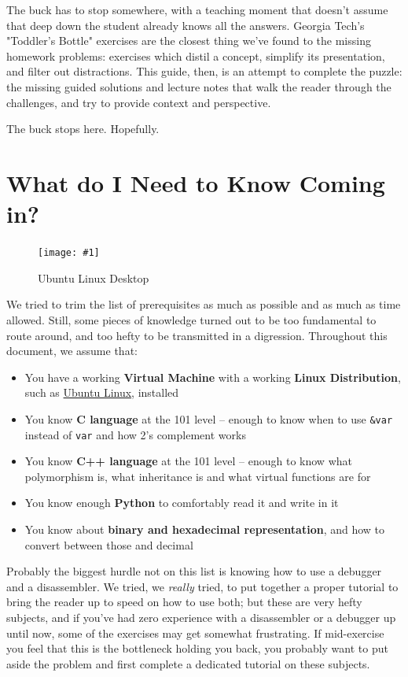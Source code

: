 \documentclass{article}
\newcommand{\wrapimagerightcap}[2] {
    \begin{figure}\begin{center}\texttt{[image: \#1]}\end{center}\caption{#2}\end{figure}}
\newcommand{\code}[1]{\colorbox{ubuntuback}{\texttt{#1}}}
\begin{document}
The buck has to stop somewhere, with a teaching moment that doesn't assume that deep down the student already knows all the answers. Georgia Tech's "Toddler's Bottle" exercises are the closest thing we've found to the missing homework problems: exercises which distil a concept, simplify its presentation, and filter out distractions. This guide, then, is an attempt to complete the puzzle: the missing guided solutions and lecture notes that walk the reader through the challenges, and try to provide context and perspective.

The buck stops here. Hopefully.

\section{What do I Need to Know Coming in?}

\wrapimagerightcap{./images/ubuntu.png}{Ubuntu Linux Desktop}

We tried to trim the list of prerequisites as much as possible and as much as time allowed. Still, some pieces of knowledge turned out to be too fundamental to route around, and too hefty to be transmitted in a digression. Throughout this document, we assume that:

\begin{itemize}
    \item You have a working \textbf{Virtual Machine} with a working \textbf{Linux Distribution}, such as \href{https://ubuntu.com/}{Ubuntu Linux}, installed
    \item You know \textbf{C language} at the 101 level -- enough to know when to use \code{\&var} instead of \code{var} and how 2's complement works
    \item You know \textbf{C++ language} at the 101 level -- enough to know what polymorphism is, what inheritance is and what virtual functions are for
    \item You know enough \textbf{Python} to comfortably read it and write in it
    \item You know about \textbf{binary and hexadecimal representation}, and how to convert between those and decimal
\end{itemize}

Probably the biggest hurdle not on this list is knowing how to use a debugger and a disassembler. We tried, we \textit{really} tried, to put together a proper tutorial to bring the reader up to speed on how to use both; but these are very hefty subjects, and if you've had zero experience with a disassembler or a debugger up until now, some of the exercises may get somewhat frustrating. If mid-exercise you feel that this is the bottleneck holding you back, you probably want to put aside the problem and first complete a dedicated tutorial on these subjects.
\end{document}
